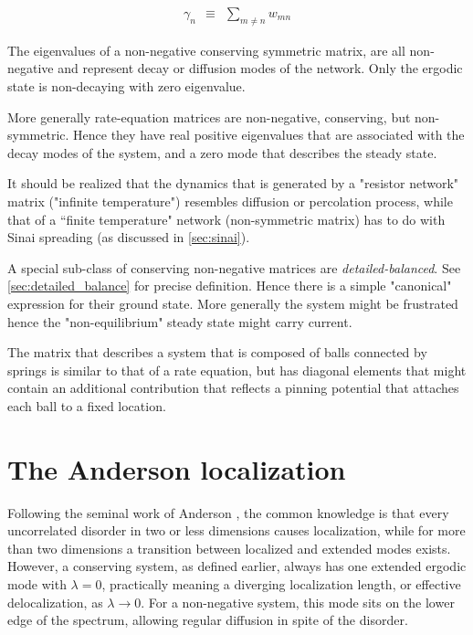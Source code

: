 %
\begin{align}\label{eq:zero_sum}
\gamma_n \ \ \equiv \ \ \sum_{m\ne n} w_{mn}
\end{align}
%

The eigenvalues of a non-negative conserving symmetric matrix, 
are all non-negative and represent decay or diffusion modes of the network. 
Only the ergodic state is non-decaying with zero eigenvalue.   

More generally rate-equation matrices are non-negative, conserving, 
but non-symmetric. Hence they have real positive eigenvalues 
that are associated with the decay modes of the system, 
and a zero mode that describes the steady state.  

It should be realized that the dynamics that is generated 
by  a "resistor network" matrix ("infinite temperature") 
resembles diffusion or percolation process, while that of 
a ``finite temperature" network (non-symmetric matrix) has to 
do with Sinai spreading (as discussed in \autoref{sec:sinai}).  

A special sub-class of conserving non-negative matrices 
are {\em detailed-balanced}. See \autoref{sec:detailed_balance} for precise definition. 
Hence there is a simple "canonical" expression for their 
ground state. More generally the system might be frustrated 
hence the "non-equilibrium" steady state might carry current.

The matrix that describes a system that is composed 
of balls connected by springs is similar to that of a 
rate equation, but has diagonal elements that might contain 
an additional contribution that reflects a pinning potential 
that attaches each ball to a fixed location.   





\section{The Anderson localization}\label{sec:anderson}


Following the seminal work of Anderson \cite{anderson_absence_1958},
the common knowledge is that every uncorrelated disorder in two or
less dimensions causes localization, while for more than two dimensions
a transition between localized and extended modes exists. However, a conserving
system, as defined earlier, always has one extended ergodic mode with $\lambda=0$,
practically meaning a diverging localization length,
or effective delocalization, as $\lambda\rightarrow 0$.
For a non-negative system, this mode sits on the lower edge of the spectrum, 
allowing regular diffusion in spite of the disorder.


